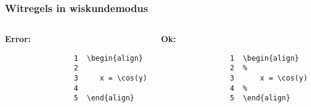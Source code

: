 

\begin{frame}[fragile]
	\frametitle{Witregels in wiskundemodus}

    \begin{columns}
        \begin{column}{0.4\textwidth}
            \textbf{\textcolor{darkpastelred}{Error:}}
            \begin{verbatim}
                1  \begin{align}
                2
                3     x = \cos(y)
                4
                5  \end{align}
            \end{verbatim}            
        \end{column}
        \begin{column}{0.4\textwidth}
            \textbf{\textcolor{darkpastelgreen}{Ok:}}
            \begin{verbatim}
                1  \begin{align}
                2  %
                3      x = \cos(y)
                4  %
                5  \end{align}
            \end{verbatim}            
        \end{column}
    \end{columns}



\end{frame}
